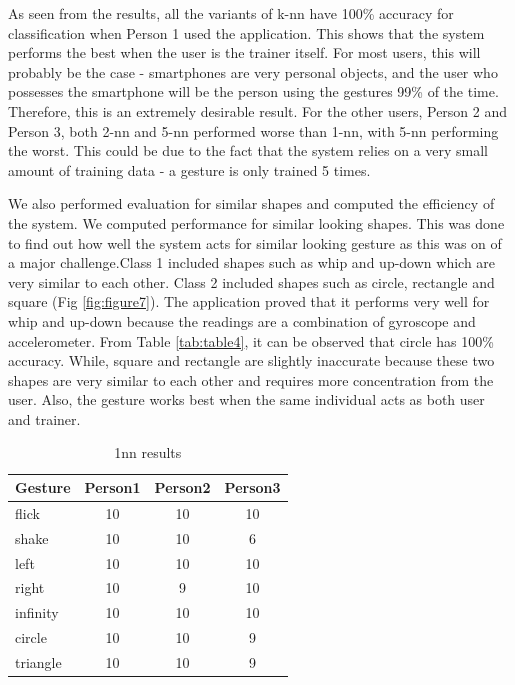 \documentclass{sigchi}
\begin{document}
As seen from the results, all the variants of k-nn have 100\% accuracy for classification when Person 1 used the application. This shows that the system performs the best when the user is the trainer itself. For most users, this will probably be the case - smartphones are very personal objects, and the user who possesses the smartphone will be the person using the gestures 99\% of the time. Therefore, this is an extremely desirable result. For the other users, Person 2 and Person 3, both 2-nn and 5-nn performed worse than 1-nn, with 5-nn performing the worst. This could be due to the fact that the system relies on a very small amount of training data - a gesture is only trained 5 times. 

We also performed evaluation for similar shapes and computed the efficiency of the system. We computed performance for similar looking shapes. This was done to find out how well the system acts for similar looking gesture as this was on of a major challenge.Class 1 included shapes such as whip and up-down which are very similar to each other. Class 2 included shapes such as circle, rectangle and square (Fig \ref{fig:figure7}). The application proved that it performs very well for whip and up-down because the readings are a combination of gyroscope and accelerometer. From Table \ref{tab:table4}, it can be observed that circle has 100\% accuracy. While, square and rectangle are slightly inaccurate because these two shapes are very similar to each other and requires more concentration from the user. Also, the gesture works best when the same individual acts as both user and trainer.




\begin{table}[ht]
  \centering
  \begin{tabular}{l*{3}{c}}
    Gesture & Person1 & Person2 & Person3 \\
    \hline
	flick & 10 & 10 & 10 \\
    shake & 10 & 10 & 6 \\
    left & 10 & 10 & 10 \\
    right & 10 & 9 & 10 \\
    infinity & 10 & 10 & 10 \\
    circle & 10 & 10 & 9 \\
    triangle & 10 & 10 & 9 
  \end{tabular}
  \caption{1nn results}
  \label{tab:table1}
\end{table}
\end{document}
